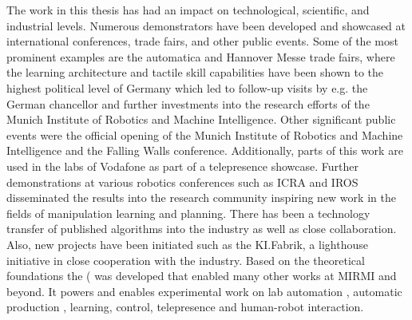 The work in this thesis has had an impact on technological, scientific, and industrial levels.
Numerous demonstrators have been developed and showcased at international conferences, trade fairs, and other public events.
Some of the most prominent examples are the automatica and Hannover Messe trade fairs, where the learning architecture and tactile skill capabilities have been shown to the highest political level of Germany which led to follow-up visits by e.g. the German chancellor and further investments into the research efforts of the Munich Institute of Robotics and Machine Intelligence.
Other significant public events were the official opening of the Munich Institute of Robotics and Machine Intelligence and the Falling Walls conference.
Additionally, parts of this work are used in the labs of Vodafone as part of a telepresence showcase.
Further demonstrations at various robotics conferences such as ICRA and IROS disseminated the results into the research community inspiring new work in the fields of manipulation learning and planning.
There has been a technology transfer of published algorithms into the industry as well as close collaboration.
Also, new projects have been initiated such as the KI.Fabrik, a lighthouse initiative in close cooperation with the industry.
Based on the theoretical foundations the \software (\softwareabbr{} was developed that enabled many other works at MIRMI and beyond.
It powers and enables experimental work on lab automation \cite{knobbe2022core}, automatic production \cite{ringwald2023towards}, learning, control, telepresence \cite{chen2022communication,moortgat2020feeling} and human-robot interaction.
